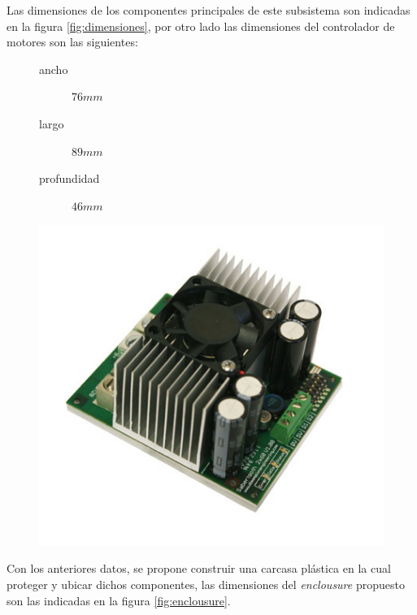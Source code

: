 Las dimensiones de los componentes principales de este subsistema son indicadas
en la figura \ref{fig:dimensiones}, por otro lado las dimensiones del
controlador de motores son las siguientes: 
\begin{figure}[th]
\centering
\begin{minipage}{.3\textwidth}
  \centering
  \begin{description}
    \item[ancho] $76mm$
    \item[largo] $89mm$
    \item[profundidad] $46mm$
  \end{description}
\end{minipage}%
\begin{minipage}{.7\textwidth}
  \centering
  \includegraphics[width=\linewidth]{Figures/motor_driver.png}
\end{minipage}
\end{figure}

Con los anteriores datos, se propone construir una carcasa pl\'astica en la cual
proteger y ubicar dichos componentes, las dimensiones del \emph{enclousure}
propuesto son las indicadas en la figura \ref{fig:enclousure}.

